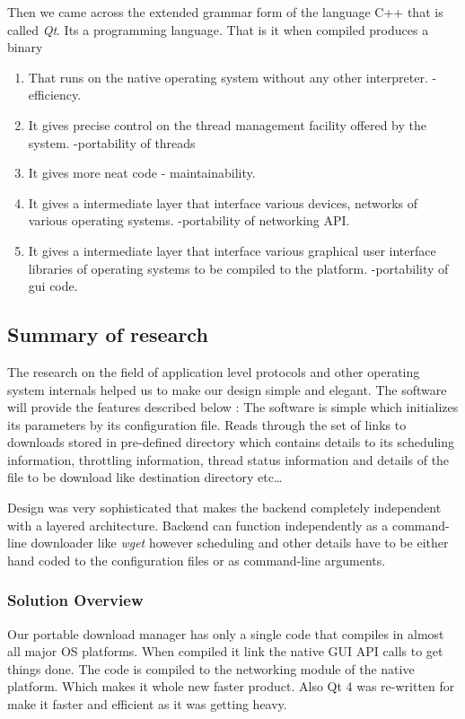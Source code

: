 \documentclass[pdftex,12pt,a4paper,pdfencoding=unicode]{article}
\begin{document}
\begin{onehalfspace}
      Then we came across the extended grammar form of the language C++ that is called \emph{Qt}. Its a programming language.
      That is it when compiled produces a binary
      \begin{enumerate}
        \item That runs on the native operating system without any other interpreter. -efficiency.
        \item It gives precise control on the thread management facility offered by the system. -portability of threads
        \item It gives more neat code - maintainability.
        \item It gives a intermediate layer that interface various devices, networks of various operating systems.
          -portability of networking API.
        \item It gives a intermediate layer that interface various graphical user interface libraries of operating systems
          to be compiled to the platform. -portability of gui code.
      \end{enumerate}

      \subsection{Summary of research}
      The research on the field of application level protocols and other operating system internals helped us to make our design simple and
      elegant. The software will provide the features described below :
      The software is simple which initializes its parameters by its configuration file. Reads through the set of links to downloads stored
      in pre-defined directory which contains details to its scheduling information, throttling information, thread status information and
      details of the file to be download like destination directory etc\ldots

      Design was very sophisticated that makes the backend completely independent with a layered architecture. Backend can function
      independently as a command-line downloader like \emph{wget} however scheduling and other details have to be either hand coded to
      the configuration files or as command-line arguments.

      \subsubsection{Solution Overview}
      Our portable download manager has only a single code that compiles in almost all major OS platforms. When compiled it link the
      native GUI API calls to get things done. The code is compiled to the networking module of the native platform. Which makes it
      whole new faster product. Also Qt 4 was re-written for make it faster and efficient as it was getting heavy.


\end{onehalfspace}
\end{document}
